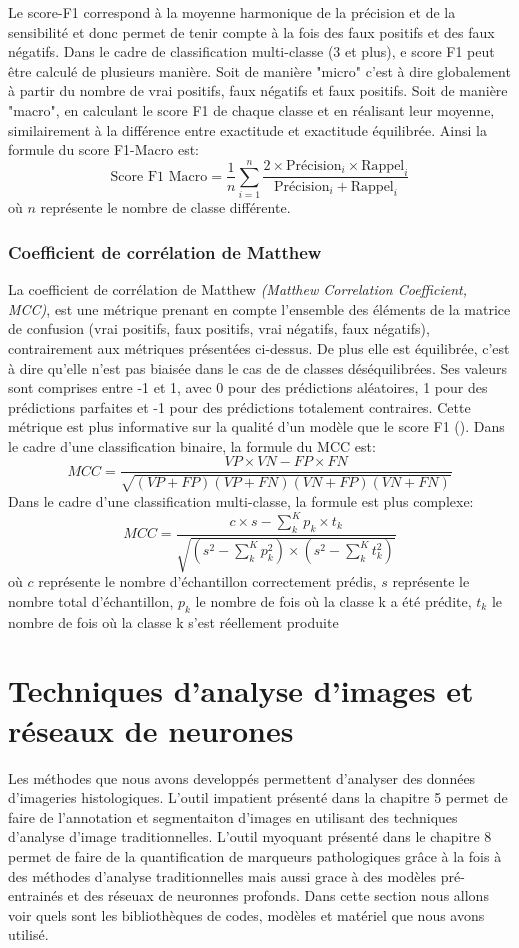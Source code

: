 Le score-F1 correspond à la moyenne harmonique de la précision et de la sensibilité et donc permet de tenir compte à la fois des faux positifs et des faux négatifs. Dans le cadre de classification multi-classe (3 et plus), e score F1 peut être calculé de plusieurs manière. Soit de manière "micro" c'est à dire globalement à partir du nombre de vrai positifs, faux négatifs et faux positifs. Soit de manière "macro", en calculant le score F1 de chaque classe et en réalisant leur moyenne, similairement à la différence entre exactitude et exactitude équilibrée. Ainsi la formule du score F1-Macro est:
\[ \text{Score F1 Macro} = \frac{1}{n} \sum_{i=1}^{n} \frac{2 \times \text{Précision}_i \times \text{Rappel}_i}{\text{Précision}_i + \text{Rappel}_i} \] où \(n\) représente le nombre de classe différente.

\subsubsection{Coefficient de corrélation de Matthew}
La coefficient de corrélation de Matthew \textit{(Matthew Correlation Coefficient, MCC)}, est une métrique prenant en compte l'ensemble des éléments de la matrice de confusion (vrai positifs, faux positifs, vrai négatifs, faux négatifs), contrairement aux métriques présentées ci-dessus. De plus elle est équilibrée, c'est à dire qu'elle n'est pas biaisée dans le cas de de classes déséquilibrées. Ses valeurs sont comprises entre -1 et 1, avec 0 pour des prédictions aléatoires, 1 pour des prédictions parfaites et -1 pour des prédictions totalement contraires. Cette métrique est plus informative sur la qualité d'un modèle que le score F1 (\cite{chicco_advantages_2020}). Dans le cadre d'une classification binaire, la formule du MCC est:
\[ MCC = \frac{VP \times VN - FP \times FN}{\sqrt{(VP + FP)(VP + FN)(VN + FP)(VN + FN)}} \]
Dans le cadre d'une classification multi-classe, la formule est plus complexe:
\[ MCC = \frac{
    c \times s - \sum_{k}^{K} p_k \times t_k
}{\sqrt{
    (s^2 - \sum_{k}^{K} p_k^2) \times
    (s^2 - \sum_{k}^{K} t_k^2)
}} \]
où \(c\) représente le nombre d'échantillon correctement prédis, \(s\) représente le nombre total d'échantillon, \(p_k\) le nombre de fois où la classe k a été prédite, \(t_k\) le nombre de fois où la classe k s'est réellement produite

\section{Techniques d'analyse d'images et réseaux de neurones}
Les méthodes que nous avons developpés permettent d'analyser des données d'imageries histologiques. L'outil \gls{impatient} présenté dans la chapitre 5 permet de faire de l'annotation et segmentaiton d'images en utilisant des techniques d'analyse d'image traditionnelles. L'outil \gls{myoquant} présenté dans le chapitre 8 permet de faire de la quantification de marqueurs pathologiques grâce à la fois à des méthodes d'analyse traditionnelles mais aussi grace à des modèles pré-entrainés et des réseuax de neuronnes profonds.  Dans cette section nous allons voir quels sont les bibliothèques de codes, modèles et matériel que nous avons utilisé. 

